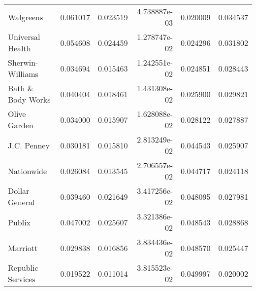 \begin{tabular}{lrrrrr}
                 Walgreens &     0.061017 & 0.023519 & 4.738887e-03 & 0.020009 &          0.034537 \\
          Universal Health &     0.054608 & 0.024459 & 1.278747e-02 & 0.024296 &          0.031802 \\
          Sherwin-Williams &     0.034694 & 0.015463 & 1.242551e-02 & 0.024851 &          0.028443 \\
         Bath \& Body Works &     0.040404 & 0.018461 & 1.431308e-02 & 0.025900 &          0.029821 \\
              Olive Garden &     0.034000 & 0.015907 & 1.628088e-02 & 0.028122 &          0.027887 \\
               J.C. Penney &     0.030181 & 0.015810 & 2.813249e-02 & 0.044543 &          0.025907 \\
                Nationwide &     0.026084 & 0.013545 & 2.706557e-02 & 0.044717 &          0.024118 \\
            Dollar General &     0.039460 & 0.021649 & 3.417256e-02 & 0.048095 &          0.027981 \\
                    Publix &     0.047002 & 0.025607 & 3.321386e-02 & 0.048543 &          0.028868 \\
                  Marriott &     0.029838 & 0.016856 & 3.834436e-02 & 0.048570 &          0.025447 \\
         Republic Services &     0.019522 & 0.011014 & 3.815523e-02 & 0.049997 &          0.020002 \\
\bottomrule
\end{tabular}
